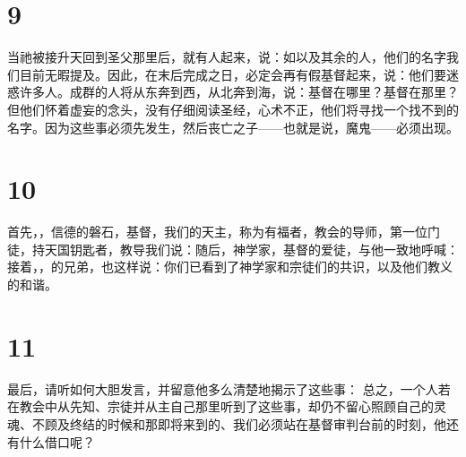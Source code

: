 
\section{9}

当祂被接升天回到圣父那里后，就有人起来，说：如以及其余的人，他们的名字我们目前无暇提及。因此，在末后完成之日，必定会再有假基督起来，说：他们要迷惑许多人。成群的人将从东奔到西，从北奔到海，说：基督在哪里？基督在那里？但他们怀着虚妄的念头，没有仔细阅读圣经，心术不正，他们将寻找一个找不到的名字。因为这些事必须先发生，然后丧亡之子——也就是说，魔鬼——必须出现。\par


\section{10}

首先，，信德的磐石，基督，我们的天主，称为有福者，教会的导师，第一位门徒，持天国钥匙者，教导我们说：随后，神学家，基督的爱徒，与他一致地呼喊：接着，，的兄弟，也这样说：你们已看到了神学家和宗徒们的共识，以及他们教义的和谐。\par


\section{11}

最后，请听如何大胆发言，并留意他多么清楚地揭示了这些事： 总之，一个人若在教会中从先知、宗徒并从主自己那里听到了这些事，却仍不留心照顾自己的灵魂、不顾及终结的时候和那即将来到的、我们必须站在基督审判台前的时刻，他还有什么借口呢？\par

